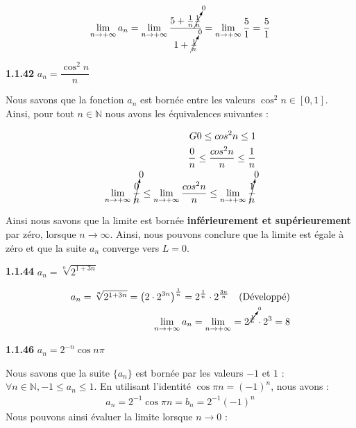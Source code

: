 \documentclass{report}
\begin{document}
    \begin{align*}
        \lim\limits_{n \to+\infty }a_n  = 
        \lim\limits_{n \to+\infty }\dfrac{5  + \frac{1}{n}
        \cancelto{0}{\frac{1}{n}}}{1 + \cancelto{0}{\frac{1}{n}}}  =
        \lim\limits_{n \to+\infty } \frac{5}{1} = \dfrac{5}{1} 
    \end{align*}



    \noindent\textbf{1.1.42}  $a_n = \dfrac{\cos^{2}n}{n}$  
    \vspace{1em}

    Nous savons que la fonction $a_n$ est bornée entre les valeurs
    $\cos^{2}n \in [0, 1]$. Ainsi, pour tout $n \in \mathbb{N}$ 
    nous avons les équivalences suivantes : 

    \begin{align*}G
        0 \leq cos^{2}n  \leq 1 \\ 
        \dfrac{0}{n} \leq \dfrac{cos^{2} n}{n}  \leq \dfrac{1}{n}\\ 
        \lim\limits_{n \to+\infty }\cancelto{0}{\dfrac{0}{n}} \leq  
        \lim\limits_{n \to+\infty }\dfrac{cos^{2} n}{n} \leq 
        \lim\limits_{n \to+\infty }\cancelto{0}{\dfrac{1}{n}}
    \end{align*}

    Ainsi nous savons que la limite est bornée 
    \textbf{inférieurement et supérieurement} 
    par zéro, lorsque $n \longrightarrow \infty$. Ainsi, nous pouvons conclure 
    que la limite est égale à zéro et que la suite $a_n$ converge vers 
    $L = 0$. 

        
    \vspace{1em}%
    \noindent\textbf{1.1.44}  $a_n = \sqrt[n]{2^{1 + 3n}}$

    \begin{align*}
        a_n 
        = \sqrt[n]{2^{1 + 3n}} 
        = \left(2 \cdot 2^{3n} \right)^{\frac{1}{n}}
        = 2^{\frac{1}{n}} \cdot 2^{\frac{3n}{n}} \quad \text{(Développé)} \\ 
        \lim\limits_{n \to+\infty }a_n 
        = 
        \lim\limits_{n \to+\infty }  
        = 
        2^{\cancelto{0}{\frac{1}{n}}} \cdot 2^{3} = 8
    \end{align*}        

    \vspace{1em}
    \noindent\textbf{1.1.46}  $a_n = 2^{-n}\cos n\pi$ 

    Nous savons que la suite $\{a_n\}$ est bornée par les valeurs 
    $-1$ et $1$ :
    $\forall n \in \mathbb{N}, -1 \leq a_n \leq 1$. En utilisant l'identité 
    $\cos\pi n = (-1)^n$, nous avons : 
    \begin{align*}
        a_n = 2^{-1}\cos\pi n  =  b_n = 2^{-1}(-1)^n 
    \end{align*}
    Nous pouvons ainsi évaluer la limite lorsque $n \longrightarrow 0$ :
\end{document}
